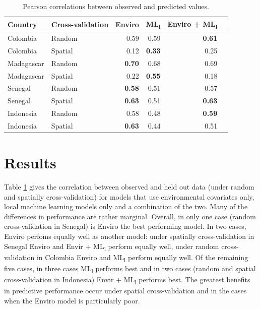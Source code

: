 \documentclass[review]{elsarticle}
\begin{document}
\begin{table}[t!]
\caption{Pearson correlations between observed and predicted values. }
\centering
\begin{tabular}{llrrrr}
Country &  Cross-validation & Enviro &  ML\textsubscript{l} &  Enviro + ML\textsubscript{l} \\
\hline 
 Colombia & Random &  0.59 & 0.59 & \textbf{0.61} \\
 Colombia &  Spatial &  0.12 &  \textbf{0.33} &  0.25\\
 Madagascar & Random &   \textbf{0.70} &  0.68 & 0.69 \\
 Madagascar &  Spatial &  0.22 &  \textbf{0.55} & 0.18\\
 Senegal &  Random &  \textbf{0.58} &  0.51 & 0.57 \\
 Senegal &  Spatial &  \textbf{0.63} &  0.51 &  \textbf{0.63} \\
 Indonesia &  Random &  0.58 &  0.48 &  \textbf{0.59} \\
 Indonesia &  Spatial &  \textbf{0.63} &  0.44 &  0.51 \\
\end{tabular}
\label{t:results}
\end{table}


\section{Results}





Table \ref{t:results} gives the correlation between observed and held out data (under random and spatially cross-validation) for models that use environmental covariates only, local machine learning models only and a combination of the two.
Many of the differences in performance are rather marginal.
Overall, in only one case (random cross-validation in Senegal) is Enviro the best performing model.
In two cases, Enviro perfoms equally well as another model: under spatially cross-validation in Senegal Enviro and Envir + ML\textsubscript{l} perform equally well, under random cross-validation in Colombia Enviro and ML\textsubscript{l} perform equally well.
Of the remaining five cases, in three cases ML\textsubscript{l} performs best and in two cases (random and spatial cross-validation in Indonesia) Envir + ML\textsubscript{l} performs best.
The greatest benefits in predictive performance occur under spatial cross-validation and in the cases when the Enviro model is particularly poor.
\end{document}
